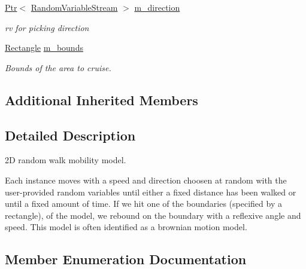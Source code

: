 \begin{DoxyCompactItemize}
\hyperlink{classns3_1_1Ptr}{Ptr}$<$ \hyperlink{classns3_1_1RandomVariableStream}{Random\+Variable\+Stream} $>$ \hyperlink{classns3_1_1RandomWalk2dMobilityModel_aeb1b44301452863dc8892007dac92ce7}{m\+\_\+direction}
\begin{DoxyCompactList}\small\item\em rv for picking direction \end{DoxyCompactList}\item 
\hyperlink{classns3_1_1Rectangle}{Rectangle} \hyperlink{classns3_1_1RandomWalk2dMobilityModel_ae0f3bcf061463a6f6245e22f47c560dc}{m\+\_\+bounds}
\begin{DoxyCompactList}\small\item\em Bounds of the area to cruise. \end{DoxyCompactList}\end{DoxyCompactItemize}
\subsection*{Additional Inherited Members}


\subsection{Detailed Description}
2D random walk mobility model. 

Each instance moves with a speed and direction choosen at random with the user-\/provided random variables until either a fixed distance has been walked or until a fixed amount of time. If we hit one of the boundaries (specified by a rectangle), of the model, we rebound on the boundary with a reflexive angle and speed. This model is often identified as a brownian motion model. 

\subsection{Member Enumeration Documentation}
